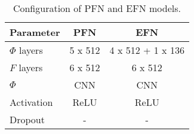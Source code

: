 \begin{table}[h]
    \centering
    \caption{Configuration of PFN and EFN models.}
    \label{tab:pfn_config}
    \begin{tabular}{@{}lcc@{}}
    \toprule
    \textbf{Parameter} & \textbf{PFN} & \textbf{EFN} \\ \midrule
    $\Phi$ layers & 5 x 512 & 4 x 512 + 1 x 136 \\
    $F$ layers & 6 x 512 & 6 x 512 \\
    $\Phi$ & CNN & CNN \\
    Activation & ReLU & ReLU \\
    Dropout & - & - \\
    \bottomrule
    \end{tabular}
\end{table}